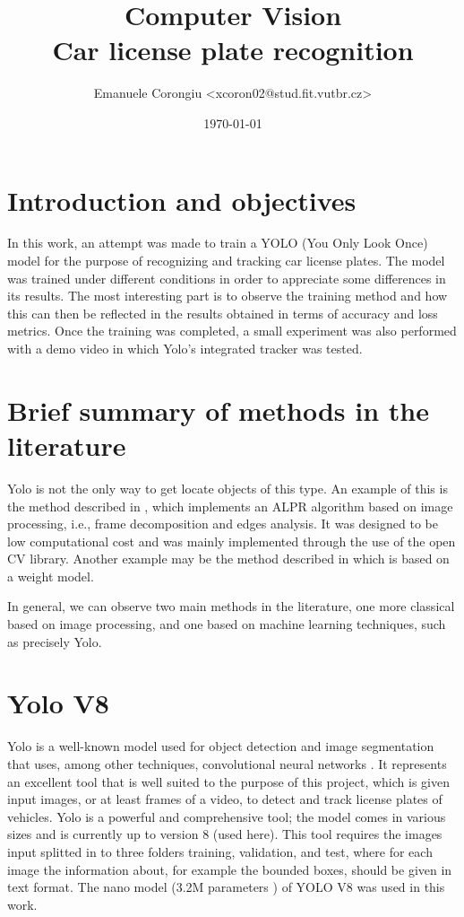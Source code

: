 \documentclass[12pt]{article}
\title{\textbf{Computer Vision \\
Car license plate recognition}}
\author{Emanuele Corongiu <xcoron02@stud.fit.vutbr.cz>}
\date{\today}
\begin{document}


\section{Introduction and objectives}
In this work, an attempt was made to train a YOLO (You Only Look Once) model for the purpose of recognizing and tracking car license plates. The model was trained under different conditions in order to appreciate some differences in its results. The most interesting part is to observe the training method and how this can then be reflected in the results obtained in terms of accuracy and loss metrics. Once the training was completed, a small experiment was also performed with a demo video in which Yolo's integrated tracker was tested.



\section{Brief summary of methods in the literature}
Yolo is not the only way to get locate objects of this type. An example of this is the method described in \cite{9790745}, which implements an ALPR algorithm based on image processing, i.e., frame decomposition and edges analysis. It was designed to be low computational cost and was mainly implemented through the use of the open CV library. Another example may be the method described in \cite{9755690} which is based on a weight model.

In general, we can observe two main methods \cite{9755690} in the literature, one more classical based on image processing, and one based on machine learning techniques, such as precisely Yolo.
\clearpage

\section{Yolo V8}
Yolo \cite{yolo1} is a well-known model used for object detection and image segmentation that uses, among other techniques, convolutional neural networks \cite{CV_course_slide}. It represents an excellent tool that is well suited to the purpose of this project, which is given input images, or at least frames of a video, to detect and track license plates of vehicles. Yolo is a powerful and comprehensive tool; the model comes in various sizes and is currently up to version 8 (used here). This tool requires the images input splitted in to three folders training, validation, and test, where for each image the information about, for example the bounded boxes, should be given in text format. The nano model (3.2M parameters \cite{yolo1}) of YOLO V8 was used in this work.
\end{document}
